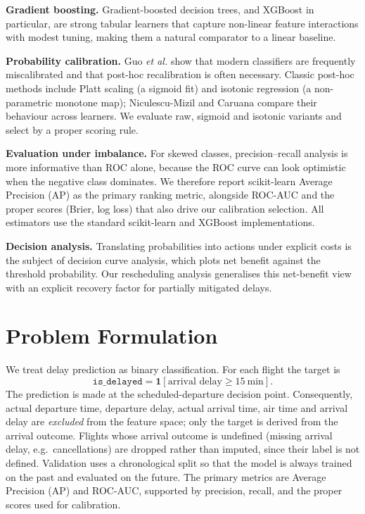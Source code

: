 \documentclass[conference]{IEEEtran}
\newcommand{\code}[1]{\texttt{#1}}
\begin{document}
\textbf{Gradient boosting.} Gradient-boosted decision trees, and XGBoost in
particular, are strong tabular learners that capture non-linear
feature interactions with modest tuning, making them a natural comparator to a
linear baseline.

\textbf{Probability calibration.} Guo \emph{et al.} show that modern
classifiers are frequently miscalibrated and that post-hoc recalibration is
often necessary. Classic post-hoc methods include Platt scaling (a sigmoid
fit) and isotonic regression (a non-parametric monotone
map); Niculescu-Mizil and Caruana compare their
behaviour across learners. We evaluate raw, sigmoid and isotonic variants and
select by a proper scoring rule.

\textbf{Evaluation under imbalance.} For skewed classes, precision--recall
analysis is more informative than ROC alone, because the ROC
curve can look optimistic when the negative class dominates. We therefore
report scikit-learn Average Precision (AP) as the primary ranking metric,
alongside ROC-AUC and the proper
scores (Brier, log loss) that also drive our calibration selection. All
estimators use the standard scikit-learn and XGBoost
implementations.

\textbf{Decision analysis.} Translating probabilities into actions under explicit
costs is the subject of decision curve analysis, which plots net
benefit against the threshold probability. Our rescheduling analysis generalises
this net-benefit view with an explicit recovery factor for partially mitigated
delays.

\section{Problem Formulation}
\label{sec:problem}
We treat delay prediction as binary classification. For each flight the target is
\begin{equation}
\code{is\_delayed} = \mathbf{1}\!\left[\text{arrival delay} \geq 15~\text{min}\right].
\end{equation}
The prediction is made at the scheduled-departure decision point. Consequently,
actual departure time, departure delay, actual arrival time, air time and
arrival delay are \emph{excluded} from the feature space; only the target is
derived from the arrival outcome. Flights whose arrival outcome is undefined
(missing arrival delay, e.g.\ cancellations) are dropped rather than imputed,
since their label is not defined. Validation uses a chronological split so that
the model is always trained on the past and evaluated on the future. The primary
metrics are Average Precision (AP) and ROC-AUC, supported by precision, recall, and the proper
scores used for calibration.
\end{document}
